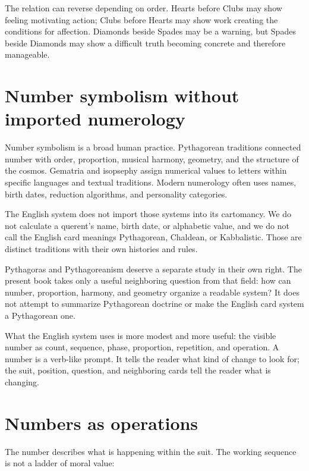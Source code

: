 The relation can reverse depending on order. Hearts before Clubs may show
feeling motivating action; Clubs before Hearts may show work creating the
conditions for affection. Diamonds beside Spades may be a warning, but Spades
beside Diamonds may show a difficult truth becoming concrete and therefore
manageable.

\section{Number symbolism without imported numerology}

Number symbolism is a broad human practice. Pythagorean traditions connected
number with order, proportion, musical harmony, geometry, and the structure of
the cosmos. Gematria and isopsephy assign numerical values to letters within
specific languages and textual traditions. Modern numerology often uses names,
birth dates, reduction algorithms, and personality categories.

The English system does not import those systems into its cartomancy. We do not
calculate a querent's name, birth date, or alphabetic value, and we do not call
the English card meanings Pythagorean, Chaldean, or Kabbalistic. Those are
distinct traditions with their own histories and rules.

Pythagoras and Pythagoreanism deserve a separate study in their own right. The
present book takes only a useful neighboring question from that field: how can
number, proportion, harmony, and geometry organize a readable system? It does
not attempt to summarize Pythagorean doctrine or make the English card system a
Pythagorean one.

What the English system uses is more modest and more useful: the visible number
as count, sequence, phase, proportion, repetition, and operation. A number is a
verb-like prompt. It tells the reader what kind of change to look for; the suit,
position, question, and neighboring cards tell the reader what is changing.

\section{Numbers as operations}

The number describes what is happening within the suit. The working sequence is
not a ladder of moral value:


